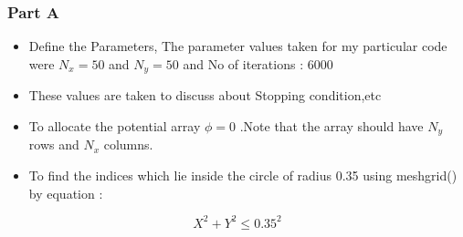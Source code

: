 \documentclass[11pt, a4paper]{article}
\begin{document}
\subsubsection{Part A}\label{part-a}

\begin{itemize}
\item
  Define the Parameters, The parameter values taken for my particular code were \(N_x = 50\) and \(N_y = 50\) and No of
  iterations : 6000
\item
  These values are taken to discuss about Stopping condition,etc
\item
  To allocate the potential array \(\phi = 0\) .Note that the array
  should have \(N_y\) rows and \(N_x\) columns.
\item
  To find the indices which lie inside the circle of radius 0.35 using
  meshgrid() by equation :
\end{itemize}

\begin{equation}
X ^2 +Y ^2 \leq	 0.35^2
\end{equation}
\end{document}

